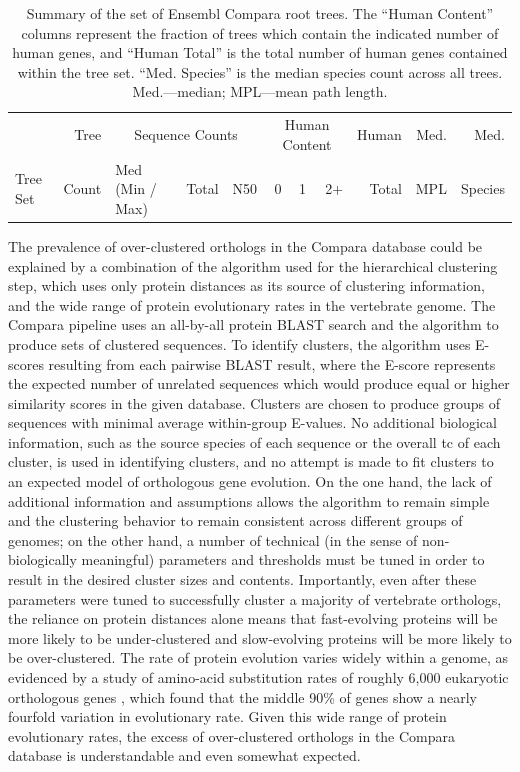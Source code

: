 \begin{table}
\scriptsize \centering
\begin{tabular}{lrb{2cm}rrrrrrrr}
\toprule
 & Tree &  \multicolumn{3}{c}{Sequence Counts} & \multicolumn{3}{c}{Human Content} & Human & Med. & Med. \\ \cmidrule(r){3-5} \cmidrule(r){6-8}
Tree Set & Count  & \tiny{Med (Min / Max)} & Total & N50 & 0 & 1 & 2+ & Total & MPL & Species \\ 
  \midrule

   \bottomrule
\end{tabular}
\caption{Summary of the set of Ensembl Compara root trees. The ``Human
  Content'' columns represent the fraction of trees which contain the
  indicated number of human genes, and ``Human Total'' is the total
  number of human genes contained within the tree set. ``Med. Species''
  is the median species count across all trees. Med.---median;
  MPL---mean path length.}
\label{table_ensembl_roots}
\end{table}


The prevalence of over-clustered \euth orthologs in the Compara
database could be explained by a combination of the \hclust algorithm
used for the hierarchical clustering step, which uses only protein
distances as its source of clustering information, and the wide range
of protein evolutionary rates in the vertebrate genome. The Compara
pipeline uses an all-by-all protein BLAST search and the \hclust
algorithm to produce sets of clustered sequences. To identify
clusters, the \hclust algorithm uses E-scores resulting from each
pairwise BLAST result, where the E-score represents the expected
number of unrelated sequences which would produce equal or higher
similarity scores in the given database. Clusters are chosen to
produce groups of sequences with minimal average within-group
E-values. No additional biological information, such as the source
species of each sequence or the overall \acl{tc} of each cluster, is
used in identifying clusters, and no attempt is made to fit clusters
to an expected model of orthologous gene evolution. On the one hand,
the lack of additional information and assumptions allows the
algorithm to remain simple and the clustering behavior to remain
consistent across different groups of genomes; on the other hand, a
number of technical (in the sense of non-biologically meaningful)
parameters and thresholds must be tuned in order to result in the
desired cluster sizes and contents. Importantly, even after these
parameters were tuned to successfully cluster a majority of vertebrate
orthologs, the reliance on protein distances alone means that
fast-evolving proteins will be more likely to be under-clustered and
slow-evolving proteins will be more likely to be over-clustered. The
rate of protein evolution varies widely within a genome, as evidenced
by a study of amino-acid substitution rates of roughly 6,000
eukaryotic orthologous genes \citep{Koonin2004}, which found that the
middle 90\% of genes show a nearly fourfold variation in evolutionary
rate. Given this wide range of protein evolutionary rates, the excess
of over-clustered orthologs in the Compara database is understandable
and even somewhat expected.

